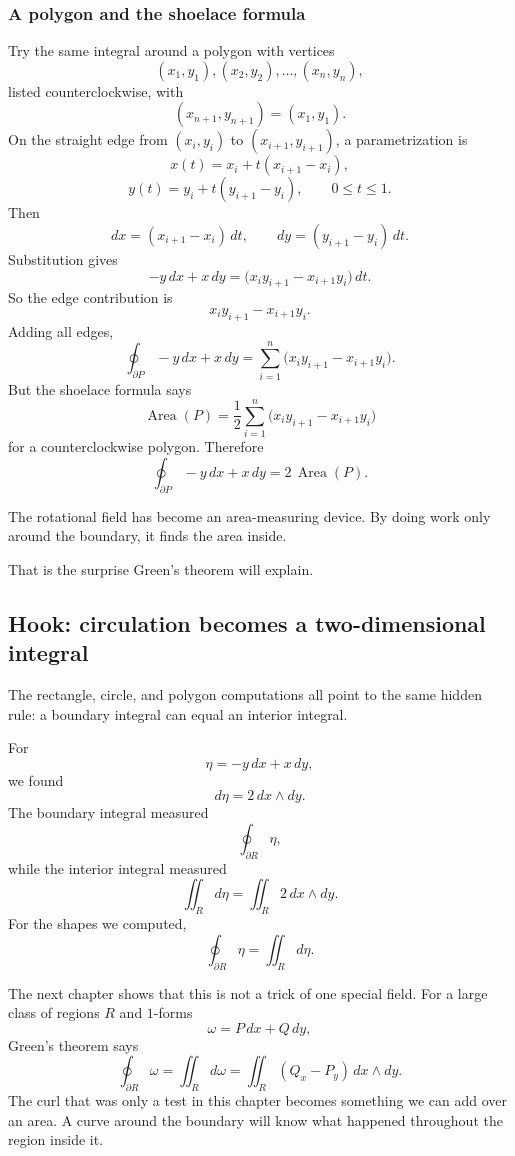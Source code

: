 \subsubsection*{A polygon and the shoelace formula}

Try the same integral around a polygon with vertices
\[
    (x_1,y_1),(x_2,y_2),\ldots,(x_n,y_n),
\]
listed counterclockwise, with
\[
    (x_{n+1},y_{n+1})=(x_1,y_1).
\]
On the straight edge from \((x_i,y_i)\) to \((x_{i+1},y_{i+1})\), a parametrization is
\[
    x(t)=x_i+t(x_{i+1}-x_i),
\]
\[
    y(t)=y_i+t(y_{i+1}-y_i),
    \qquad 0\le t\le1.
\]
Then
\[
    dx=(x_{i+1}-x_i)\,dt,
    \qquad
    dy=(y_{i+1}-y_i)\,dt.
\]
Substitution gives
\[
    -y\,dx+x\,dy
    =
    \bigl(x_i y_{i+1}-x_{i+1}y_i\bigr)\,dt.
\]
So the edge contribution is
\[
    x_i y_{i+1}-x_{i+1}y_i.
\]
Adding all edges,
\[
\boxed{
    \oint_{\partial P}-y\,dx+x\,dy
    =
    \sum_{i=1}^n
    \bigl(x_i y_{i+1}-x_{i+1}y_i\bigr).
}
\]
But the shoelace formula says
\[
\boxed{
    \operatorname{Area}(P)
    =
    \frac12
    \sum_{i=1}^n
    \bigl(x_i y_{i+1}-x_{i+1}y_i\bigr)
}
\]
for a counterclockwise polygon.  Therefore
\[
\boxed{
    \oint_{\partial P}-y\,dx+x\,dy
    =
    2\,\operatorname{Area}(P).
}
\]

The rotational field has become an area-measuring device.  By doing work only around
the boundary, it finds the area inside.

That is the surprise Green's theorem will explain.

\subsection{Hook: circulation becomes a two-dimensional integral}

The rectangle, circle, and polygon computations all point to the same hidden rule:
a boundary integral can equal an interior integral.

For
\[
    \eta=-y\,dx+x\,dy,
\]
we found
\[
    d\eta=2\,dx\wedge dy.
\]
The boundary integral measured
\[
    \oint_{\partial R}\eta,
\]
while the interior integral measured
\[
    \iint_R d\eta
    =
    \iint_R 2\,dx\wedge dy.
\]
For the shapes we computed,
\[
\boxed{
    \oint_{\partial R}\eta
    =
    \iint_R d\eta.
}
\]

The next chapter shows that this is not a trick of one special field.  For a large class of
regions \(R\) and \(1\)-forms
\[
    \omega=P\,dx+Q\,dy,
\]
Green's theorem says
\[
\boxed{
    \oint_{\partial R} \omega
    =
    \iint_R d\omega
    =
    \iint_R (Q_x-P_y)\,dx\wedge dy.
}
\]
The curl that was only a test in this chapter becomes something we can add over an
area.  A curve around the boundary will know what happened throughout the region
inside it.